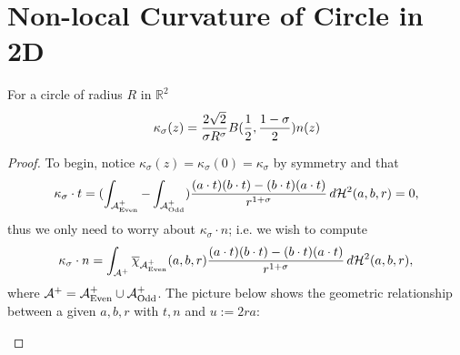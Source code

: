\documentclass{article}
\newcommand{\haus}[2]{\mathcal{H}^{#1}\parens{#2}}
\newcommand{\R}[1]{\mathbb{R}^{#1}}
\newcommand{\optparens}[1]{\ifthenelse{\equal{#1}{}}{}{\parens{#1}}}
\newcommand{\chit}[2]{\overline{\chi}_{#1}\optparens{#2}}
\newcommand{\A}{\mathcal{A}^{+}}
\newcommand{\Ae}{\A_{\textup{Even}}}
\newcommand{\Ao}{\A_{\textup{Odd}}}
\newcommand{\ks}{\kappa_\sigma}
\newcommand{\B}[1]{B\parens{#1}}
\renewcommand{\dot}[2]{{#1}\cdot{#2}}
\newcommand{\pdot}[2]{\parens{\dot{#1}{#2}}}
\begin{document}
\section{Non-local Curvature of Circle in 2D}%
\begin{theorem}
For a circle of radius $R$ in $\R{2}$
$$
  \ks(z) = \frac{2\sqrt{2}}{\sigma R^\sigma} \B{\frac{1}{2}, \frac{1-\sigma}{2}} n(z)
$$
\end{theorem}
\begin{proof}%
  To begin, notice $\ks(z) = \ks(0) = \ks$ by symmetry and that
  $$
  \dot{\ks}{t} = \parens{\int_{\Ae} - \int_{\Ao}} \frac{\pdot{a}{t}\pdot{b}{t} - \pdot{b}{t}\pdot{a}{t}}{r^{1+\sigma}} \, d\haus{2}{a,b,r} = 0,
  $$
  thus we only need to worry about $\dot{\ks}{n}$; i.e. we wish to compute
  $$
  \dot{\ks}{n} = \int_{\A} \chit{\Ae}{a, b, r} \frac{\pdot{a}{t}\pdot{b}{t} - \pdot{b}{t}\pdot{a}{t}}{r^{1+\sigma}} \, d\haus{2}{a,b,r},
  $$
  where $\A = \Ae \cup \Ao$. The picture below shows the geometric relationship between a given $a, b, r$ with $t, n$ and $u := 2ra$:

\begin{center}
\end{center}
\end{proof}
\end{document}
